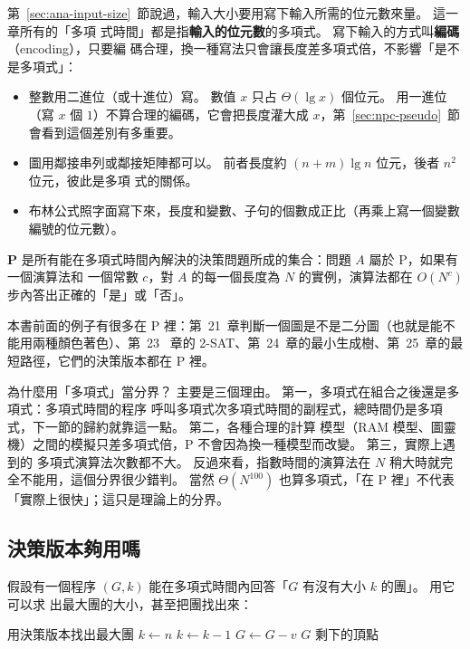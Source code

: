 第~\ref{sec:ana-input-size}~節說過，輸入大小要用寫下輸入所需的位元數來量。 這一章所有的「多項
式時間」都是指\textbf{輸入的位元數}的多項式。 寫下輸入的方式叫\textbf{編碼}（encoding），只要編
碼合理，換一種寫法只會讓長度差多項式倍，不影響「是不是多項式」：

\begin{itemize}
\item 整數用二進位（或十進位）寫。 數值 $x$ 只占 $\Theta(\lg x)$ 個位元。 用一進位（寫 $x$ 個
$1$）不算合理的編碼，它會把長度灌大成 $x$，第~\ref{sec:npc-pseudo}~節會看到這個差別有多重要。
\item 圖用鄰接串列或鄰接矩陣都可以。 前者長度約 $(n + m)\lg n$ 位元，後者 $n^2$ 位元，彼此是多項
式的關係。
\item 布林公式照字面寫下來，長度和變數、子句的個數成正比（再乘上寫一個變數編號的位元數）。
\end{itemize}

\begin{definition}[P]
\label{def:npc-p}
\textbf{P} 是所有能在多項式時間內解決的決策問題所成的集合：問題 $A$ 屬於 P，如果有一個演算法和
一個常數 $c$，對 $A$ 的每一個長度為 $N$ 的實例，演算法都在 $O(N^c)$ 步內答出正確的「是」或「否」。
\end{definition}

本書前面的例子有很多在 P 裡：第~21~章判斷一個圖是不是二分圖（也就是能不能用兩種顏色著色）、第~23~
章的 2-SAT、第~24~章的最小生成樹、第~25~章的最短路徑，它們的決策版本都在 P 裡。

為什麼用「多項式」當分界？ 主要是三個理由。 第一，多項式在組合之後還是多項式：多項式時間的程序
呼叫多項式次多項式時間的副程式，總時間仍是多項式，下一節的歸約就靠這一點。 第二，各種合理的計算
模型（RAM 模型、圖靈機）之間的模擬只差多項式倍，P 不會因為換一種模型而改變。 第三，實際上遇到的
多項式演算法次數都不大。 反過來看，指數時間的演算法在 $N$ 稍大時就完全不能用，這個分界很少錯判。
當然 $\Theta(N^{100})$ 也算多項式，「在 P 裡」不代表「實際上很快」；這只是理論上的分界。

\subsection{決策版本夠用嗎}
\label{sec:npc-search}

假設有一個程序 $(G, k)$ 能在多項式時間內回答「$G$ 有沒有大小 $k$ 的團」。 用它可以求
出最大團的大小，甚至把團找出來：

\begin{pseudo}[label=alg:npc-find-clique]{用決策版本找出最大團}
    \State $k \gets n$
        \State $k \gets k - 1$
    \EndWhile
            \State $G \gets G - v$ 
        \EndIf
    \EndFor
    \State \Return $G$ 剩下的頂點
\EndFunction
\end{pseudo}

